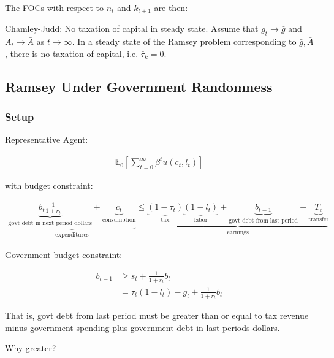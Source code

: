 \documentclass[10pt]{article}
\begin{document}
The FOCs with respect to $n_t$ 
and $k_{t+1}$ are then:



\begin{proposition} 
    Chamley-Judd: No taxation of capital in steady state. 
    Assume that $g_t \rightarrow \bar{g}$ and $A_t \rightarrow \bar{A}$ as 
    $t \rightarrow \infty$. 
    In a steady state of the Ramsey problem 
    corresponding to $\bar{g}, \bar{A}$, there is 
    no taxation of capital, i.e. $\bar{\tau}_k=0$.
\end{proposition}


\subsection{Ramsey Under Government Randomness}

\subsubsection{Setup}

Representative Agent:

\begin{align}
    \mathbb{E}_0\left[\sum_{t=0}^{\infty} \beta^t u\left(c_t, l_t\right)\right]
\end{align}

with budget constraint:

\begin{align}
    \underbrace{\underbrace{b_t \frac{1}{1+r_t}}_{\text{govt debt in next period dollars}}+\underbrace{c_t}_{\text{consumption}}}_{\text{expenditures}} \leq \underbrace{\underbrace{\left(1-\tau_t\right)}_{\text{tax}}\underbrace{\left(1-l_t\right)}_{\text{labor}}+\underbrace{b_{t-1}}_{\text{govt debt from last period}}+\underbrace{T_t}_{\text{transfer}}}_{\text{earnings}}
\end{align}

Government budget constraint:

\begin{align}
    b_{t-1} &\geq s_t+\frac{1}{1+r_t} b_t \\
    &=\tau_t\left(1-l_t\right)-g_t + \frac{1}{1+r_t} b_t
\end{align}

That is, 
govt debt from last period must be 
greater than or equal to 
tax revenue minus government spending 
plus government debt in last periods dollars.

\begin{questions}
    Why greater?
\end{questions}
\end{document}
